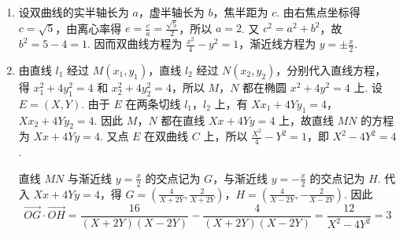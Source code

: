\begin{solution}
\begin{enumerate}
\item 设双曲线的实半轴长为 \(a\)，虚半轴长为 \(b\)，焦半距为 \(c\). 由右焦点坐标得 \(c=\sqrt{5}\)，由离心率得 \(e=\frac{c}{a}=\frac{\sqrt{5}}{2}\)，所以 \(a=2\). 又 \(c^2=a^2+b^2\)，故 \(b^2=5-4=1\). 因而双曲线方程为 \(\frac{x^2}{4}-y^2=1\)，渐近线方程为 \(y=\pm\frac{x}{2}\).
\item 由直线 \(l_1\) 经过 \(M(x_1,y_1)\)，直线 \(l_2\) 经过 \(N(x_2,y_2)\)，分别代入直线方程，得 \(x_1^2+4y_1^2=4\) 和 \(x_2^2+4y_2^2=4\)，所以 \(M\)，\(N\) 都在椭圆 \(x^2+4y^2=4\) 上. 设 \(E=(X,Y)\). 由于 \(E\) 在两条切线 \(l_1\)，\(l_2\) 上，有
\(Xx_1+4Yy_1=4\)，\(Xx_2+4Yy_2=4\).
因此 \(M\)，\(N\) 都在直线 \(Xx+4Yy=4\) 上，故直线 \(MN\) 的方程为 \(Xx+4Yy=4\). 又点 \(E\) 在双曲线 \(C\) 上，所以 \(\frac{X^2}{4}-Y^2=1\)，即 \(X^2-4Y^2=4\).

直线 \(MN\) 与渐近线 \(y=\frac{x}{2}\) 的交点记为 \(G\)，与渐近线 \(y=-\frac{x}{2}\) 的交点记为 \(H\). 代入 \(Xx+4Yy=4\)，得 \(G=\left(\frac{4}{X+2Y},\frac{2}{X+2Y}\right)\)，\(H=\left(\frac{4}{X-2Y},-\frac{2}{X-2Y}\right)\). 因此
\[
\overrightarrow{OG}\cdot\overrightarrow{OH}
=\frac{16}{(X+2Y)(X-2Y)}-\frac{4}{(X+2Y)(X-2Y)}
=\frac{12}{X^2-4Y^2}=3
\]
\end{enumerate}
\end{solution}

